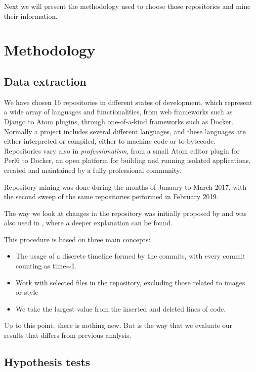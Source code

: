 \documentclass[conference]{IEEEtran}
\begin{document}
Next we will present the methodology used to choose those repositories and
mine their information. 




\section{Methodology}
\label{sec:method}

\subsection{Data extraction}
We have chosen 16 repositories in different states of development,
which represent a wide array of languages and functionalities, from
web frameworks such as Django to Atom plugins, through one-of-a-kind
frameworks such as Docker. Normally a project includes several
different languages, and these languages are either
interpreted or compiled, either to machine code or to
bytecode. Repositories vary also in {\em professionalism}, from
a small Atom editor plugin for Perl6 to Docker, an open
platform for building and running isolated applications,
created and maintained by a fully professional community.

Repository mining was done during the months of January to March
2017, with the second sweep of the same repositories performed in
February 2019.

The way we look at changes in the repository was initially proposed by \cite{Merelo2016:repomining} and was also used in
\cite{merelo2017self}, where a deeper explanation can be found.

This procedure is based on three main concepts:
\begin{itemize}
	\item The usage of a discrete timeline formed by the
	commits, with every commit counting as time=1. 
	\item Work with selected files in the repository, excluding 
	those related to images or style
	\item We take the largest value from the inserted and deleted lines of code.
\end{itemize}

Up to this point, there is nothing new. But is the way that we evaluate our results that differs from previous analysis.

\subsection{Hypothesis tests}
\end{document}
